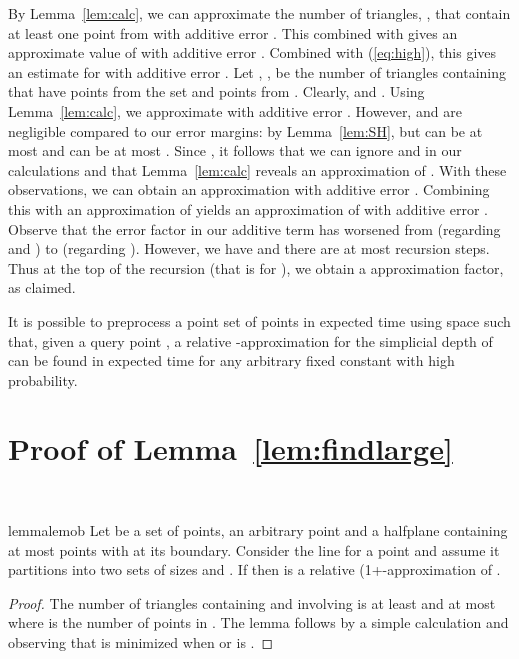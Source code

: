 By Lemma~\ref{lem:calc}, we can approximate the number of triangles, , that
contain at least one point from  with additive error
. This combined with  gives an approximate
value of  with additive error
.  Combined with (\ref{eq:high}),
this gives an estimate for  with additive
error .  Let , , be the number of triangles containing  that have  points from the set
 and  points from .  Clearly,  and .  Using Lemma~\ref{lem:calc}, we approximate  with
additive error . 
However,  and  are negligible compared to our error margins:
by Lemma~\ref{lem:SH}, 
but  can be at most  and  can be at most .
Since , it follows that
we can ignore  and  in our calculations and that Lemma~\ref{lem:calc} 
reveals an approximation of .
With these observations, we can 
obtain an approximation   with additive error
.  Combining this with an
approximation of  yields an approximation of  with additive
error .
Observe that the error factor in our additive term has worsened from  
(regarding  and ) to 
(regarding ).
However, we have  and there are at most  recursion steps.
Thus at the top of the recursion (that is for ), we obtain a
 approximation factor, as claimed.

\begin{theorem}\label{thm:2d}
	It is possible to preprocess a point set  of
	 points in  expected time
	using  space such that, given a query point ,
	a relative -approximation for the simplicial depth of  
	can be found in 
	 expected time for any arbitrary fixed constant 
	with high probability.
\end{theorem}


\section{Proof of Lemma~\ref{lem:findlarge}}~\label{sec:findlarge}

\begin{restatable}{lemma}{lemob}\label{lem:ob1}
    Let  be a set of  points,  an 
    arbitrary point and 
    a halfplane containing at most  points
    with  at its boundary.
    Consider the line  for a point  and assume
    it partitions  into two sets of sizes  and .
    If  then 
	 is a relative (1+-approximation of .
\end{restatable}
\begin{proof}
    The number of triangles containing  and involving  is at least
     and at most  where  
	is the number of points in .
    The lemma follows by a simple calculation and observing that  is minimized
    when  or  is .
\end{proof}

